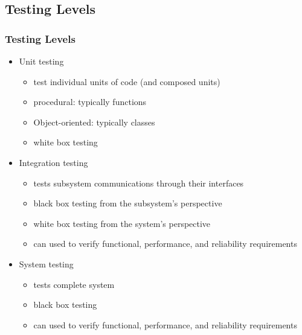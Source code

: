 \documentclass{beamer}
\begin{document}
\subsection{Testing Levels}
\begin{frame}[fragile]\frametitle{Testing Levels} 
  \begin{itemize}
    \item Unit testing
    \begin{itemize}
      \item test individual units of code (and composed units)
      \item procedural: typically functions
      \item Object-oriented: typically classes
      \item white box testing
    \end{itemize}

    \item Integration testing
    \begin{itemize}
      \item tests subsystem communications through their interfaces
      \item black box testing from the subsystem's perspective
      \item white box testing from the system's perspective
      \item can used to verify functional, performance, and reliability requirements
    \end{itemize}
    
    \item System testing
    \begin{itemize}
      \item tests complete system
      \item black box testing
      \item can used to verify functional, performance, and reliability requirements
    \end{itemize}
  \end{itemize}
\end{frame}



\end{document}
